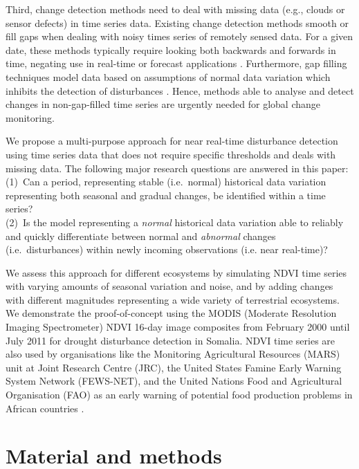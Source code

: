 \documentclass[authoryear,preprint,review,10pt]{elsarticle}
\begin{document}
Third, change detection methods need to deal with missing data (e.g., clouds or sensor defects) in time series data.
Existing change detection methods smooth or fill gaps \citep{Jonsson2002, Roerink2000, Julien2010} when dealing with noisy times series of remotely sensed data. For a given date, these methods typically require looking both backwards and forwards in time, negating use in real-time or forecast applications \citep{White2006}.  Furthermore, gap filling techniques model data based on assumptions of normal data variation which inhibits the detection of disturbances \citep{Samanta:2011hp}. Hence, methods able to analyse and detect changes in non-gap-filled time series are urgently needed for global change monitoring.

We propose a multi-purpose approach for near real-time disturbance detection using time series data that does not require specific thresholds and deals with missing data. The following major research questions are answered in this paper: \\
(1)~Can a period, representing stable (i.e.\ normal) historical data variation representing both seasonal and gradual changes, be identified within a time series?\\
(2)~Is the model representing a \emph{normal} historical data variation able to reliably and quickly differentiate between normal and \emph{abnormal} changes (i.e.\ disturbances) within newly incoming observations (i.e. near real-time)?

We assess this approach for different ecosystems by simulating NDVI time series with varying amounts of seasonal variation and noise, and by adding changes with different magnitudes representing a wide variety of terrestrial ecosystems.  We demonstrate the proof-of-concept using the MODIS (Moderate Resolution Imaging Spectrometer) NDVI 16-day image composites from February 2000 until July 2011 for drought disturbance detection in Somalia. NDVI time series are also used by organisations like the Monitoring Agricultural Resources (MARS) unit at Joint Research Centre (JRC), the United States Famine Early Warning System Network (FEWS-NET), and the United Nations Food and Agricultural Organisation (FAO) as an early warning of potential food production problems in African countries \citep{Rojas:2005bz}.
 
\section{Material and methods}
\end{document}
